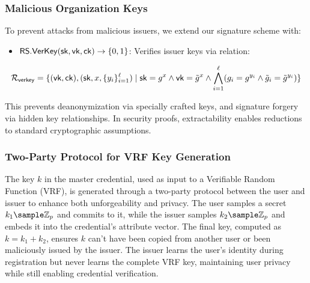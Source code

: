 \subsubsection{Malicious Organization Keys}
To prevent attacks from malicious issuers, we extend our signature scheme with:
\begin{itemize}
    \item $\mathsf{RS.VerKey}(\mathsf{sk}, \mathsf{vk}, \mathsf{ck}) \to \{0,1\}$: Verifies issuer keys via relation:
\end{itemize}
\[
\mathcal{R}_{\mathsf{verkey}} = \{(\mathsf{vk}, \mathsf{ck}),(\mathsf{sk}, x, \{y_i\}_{i=1}^\ell) \mid \mathsf{sk} = g^x \wedge \mathsf{vk} = \tilde{g}^x \wedge \bigwedge_{i=1}^\ell (g_i = g^{y_i} \wedge \tilde{g}_i = \tilde{g}^{y_i})\}
\]

This prevents deanonymization via specially crafted keys, and signature forgery via hidden key relationships. In security proofs, extractability enables reductions to standard cryptographic assumptions.

\subsubsection{Two-Party Protocol for VRF Key Generation}
The key $k$ in the master credential, used as input to a Verifiable Random Function (VRF), is generated through a two-party protocol between the user and issuer to enhance both unforgeability and privacy. The user samples a secret $k_1 \sample \mathbb{Z}_p$ and commits to it, while the issuer samples $k_2 \sample \mathbb{Z}_p$ and embeds it into the credential's attribute vector. The final key, computed as $k = k_1 + k_2$, ensures $k$ can't have been copied from another user or been maliciously issued by the issuer. The issuer learns the user's identity during registration but never learns the complete VRF key, maintaining user privacy while still enabling credential verification.




